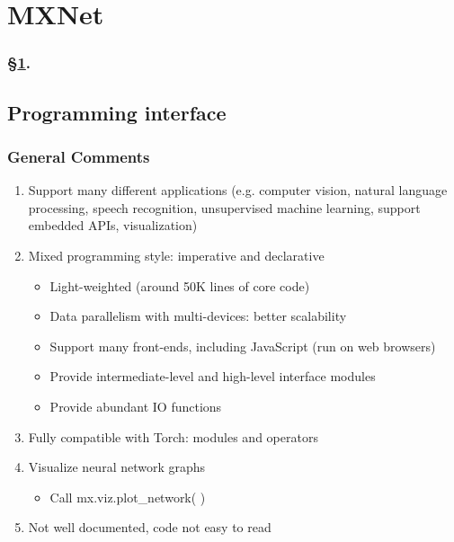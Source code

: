 
\section{MXNet}\label{sec:MxNet}


\frameinlbffalse

{

\begin{frame}[plain]
\frametitle{\S\ref{sec:MxNet}. \insertsection}
\listofframes
\end{frame}
\addtocounter{framenumber}{-1} %

}

\frameinlbftrue

\subsection{Programming interface}

\begin{frame}
  \MyLogo
  \frametitle{General Comments}  

\begin{enumerate}
%
\item Support many different applications (e.g. computer vision, natural language processing,  speech recognition, unsupervised machine learning, support embedded APIs, visualization)
%
\item Mixed programming style: imperative and declarative
\begin{itemize}
\item Light-weighted (around 50K lines of core code)
\item Data parallelism with multi-devices: better scalability
\item Support many front-ends, including JavaScript (run on web browsers)
\item Provide intermediate-level and high-level interface modules
\item Provide abundant IO functions 
%
\end{itemize}
%
\item Fully compatible with Torch: modules and operators
%
\item Visualize neural network graphs
\begin{itemize}
\item Call mx.viz.plot\_network( )
\end{itemize}
%
\item Not well documented, code not easy to read
%
\end{enumerate}

\end{frame}


